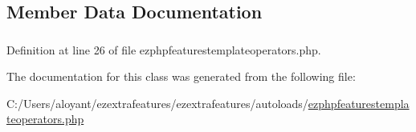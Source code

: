 \subsection{Member Data Documentation}
\hypertarget{classextension_1_1ezextrafeatures_1_1autoloads_1_1e_z_p_h_p_features_template_operators_abc89a74964f1487af8cff59bf0ddab4c}{
\subsubsection[{\$\-Operators}]{}}\label{classextension_1_1ezextrafeatures_1_1autoloads_1_1e_z_p_h_p_features_template_operators_abc89a74964f1487af8cff59bf0ddab4c}


Definition at line 26 of file ezphpfeaturestemplateoperators.\-php.



The documentation for this class was generated from the following file\-:\begin{DoxyCompactItemize}
\item 
C\-:/\-Users/aloyant/ezextrafeatures/ezextrafeatures/autoloads/\hyperlink{ezphpfeaturestemplateoperators_8php}{ezphpfeaturestemplateoperators.\-php}\end{DoxyCompactItemize}
